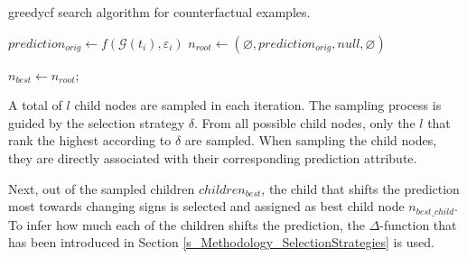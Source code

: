 {
\setlength{\algomargin}{1.25em}
\small
\begin{algorithm}[ht]
\caption{\gls{greedycf} search algorithm for counterfactual examples.}
\label{a_GreedyCF}
    $prediction_{orig} \gets f(\mathcal{G}(t_i), \varepsilon_i)$\; \label{a_GreedyCF_pred_orig}
    $n_{root} \gets (\varnothing, prediction_{orig}, null, \varnothing)$\; \label{a_GreedyCF_root_init}

    $n_{best} \gets n_{root}$; \label{a_GreedyCF_set_root_best}

\end{algorithm}
}


A total of $l$ child nodes are sampled in each iteration. The sampling process is guided by the selection strategy $\delta$. From all possible child nodes, only the $l$ that rank the highest according to $\delta$ are sampled. When sampling the child nodes, they are directly associated with their corresponding prediction attribute. 

Next, out of the sampled children $children_{best}$, the child that shifts the prediction most towards changing signs is selected and assigned as best child node $n_{best\_child}$. To infer how much each of the children shifts the prediction, the $\Delta$-function that has been introduced in Section \ref{s_Methodology_SelectionStrategies} is used. 

